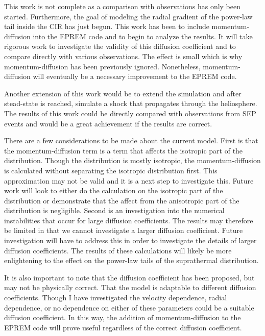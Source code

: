\documentclass[%
 reprint,
 amsmath,amssymb,
 aps,
]{revtex4-1}
\begin{document}
This work is not complete as a comparison with observations has only been started. Furthermore, the goal of modeling the radial gradient of the power-law tail inside the CIR has just begun. This work has been to include momentum-diffusion into the EPREM code and to begin to analyze the results. It will take rigorous work to investigate the validity of this diffusion coefficient and to compare directly with various observations. The effect is small which is why momentum-diffusion has been previously ignored. Nonetheless, momentum-diffusion will eventually be a necessary improvement to the EPREM code.

Another extension of this work would be to extend the simulation and after stead-state is reached, simulate a shock that propagates through the heliosphere. The results of this work could be directly compared with observations from SEP events and would be a great achievement if the results are correct.    

There are a few considerations to be made about the current model. First is that the momentum-diffusion term is a term that affects the isotropic part of the distribution. Though the distribution is mostly isotropic, the momentum-diffusion is calculated without separating the isotropic distribution first. This approximation may not be valid and it is a next step to investigate this. Future work will look to either do the calculation on the isotropic part of the distribution or demonstrate that the affect from the anisotropic part of the distribution is negligible. Second is an investigation into the numerical instabilities that occur for large diffusion coefficients. The results may therefore be limited in that we cannot investigate a larger diffusion coefficient. Future investigation will have to address this in order to investigate the details of larger diffusion coefficients. The results of these calculations will likely be more enlightening to the effect on the power-law tails of the suprathermal distribution.    

It is also important to note that the diffusion coefficient has been proposed, but may not be physically correct. That the model is adaptable to different diffusion coefficients. Though I have investigated the velocity dependence, radial dependence, or no dependence on either of these parameters could be a suitable diffusion coefficient. In this way, the addition of momentum-diffusion to the EPREM code will prove useful regardless of the correct diffusion coefficient.


\end{document}
